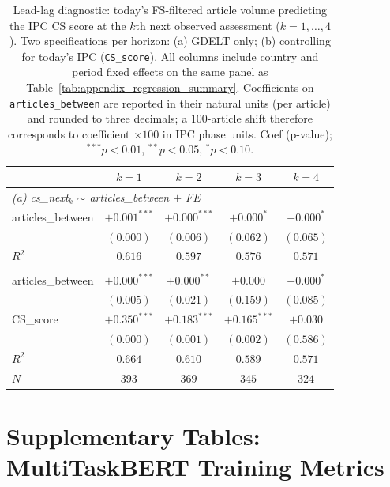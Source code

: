 \documentclass{article}
\begin{document}
\begin{table}[H]
\centering
\caption{Lead-lag diagnostic: today's FS-filtered article volume predicting the IPC CS score at the $k$th next observed assessment ($k=1,\dots,4$). Two specifications per horizon: (a) GDELT only; (b) controlling for today's IPC (\texttt{CS\_score}). All columns include country and period fixed effects on the same panel as Table~\ref{tab:appendix_regression_summary}. Coefficients on \texttt{articles\_between} are reported in their natural units (per article) and rounded to three decimals; a 100-article shift therefore corresponds to coefficient $\times 100$ in IPC phase units. Coef (p-value); $^{***}p<0.01$, $^{**}p<0.05$, $^{*}p<0.10$.}

\begin{tabular}{lcccc}
\toprule
 & $k=1$ & $k=2$ & $k=3$ & $k=4$ \\
\midrule
\multicolumn{5}{l}{\emph{(a) cs\_next$_k$ $\sim$ articles\_between $+$ FE}} \\
articles\_between & $+0.001^{***}$ & $+0.000^{***}$ & $+0.000^{*}$ & $+0.000^{*}$ \\
                  & $(0.000)$ & $(0.006)$ & $(0.062)$ & $(0.065)$ \\
$R^2$             & $0.616$ & $0.597$ & $0.576$ & $0.571$ \\
\addlinespace
\multicolumn{5}{l}{\emph{(b) cs\_next$_k$ $\sim$ articles\_between $+$ CS\_score $+$ FE}} \\
articles\_between & $+0.000^{***}$ & $+0.000^{**}$ & $+0.000$ & $+0.000^{*}$ \\
                  & $(0.005)$ & $(0.021)$ & $(0.159)$ & $(0.085)$ \\
CS\_score         & $+0.350^{***}$ & $+0.183^{***}$ & $+0.165^{***}$ & $+0.030$ \\
                  & $(0.000)$ & $(0.001)$ & $(0.002)$ & $(0.586)$ \\
$R^2$             & $0.664$ & $0.610$ & $0.589$ & $0.571$ \\
$N$               & $393$ & $369$ & $345$ & $324$ \\
\bottomrule
\end{tabular}

\label{tab:lead_lag_diagnostic}
\end{table}

\section{Supplementary Tables: MultiTaskBERT Training Metrics}
\end{document}
